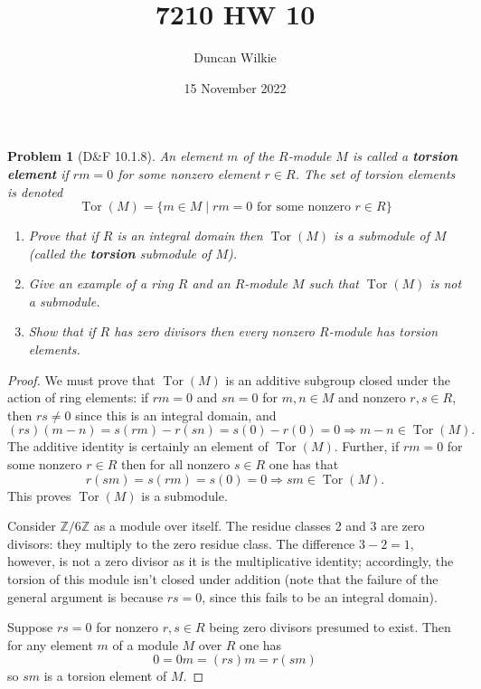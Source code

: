 \documentclass{article}
\title{7210 HW 10}
\author{Duncan Wilkie}
\date{15 November 2022}
\newtheorem{plm}{Problem}
\DeclareMathOperator{\Tor}{Tor}
\begin{document}
\maketitle

\begin{plm}[D\&F 10.1.8]
  An element $m$ of the $R$-module $M$ is called a \textbf{torsion element} if $rm = 0$ for some nonzero element $r \in R$.
  The set of torsion elements is denoted
  \[
    \Tor(M) = \{m \in M \mid rm = 0 \text{ for some nonzero } r \in R\}
  \]
  \begin{enumerate}
  \item Prove that if $R$ is an integral domain then $\Tor(M)$ is a submodule of $M$ (called the \textbf{torsion} submodule of $M$).
  \item Give an example of a ring $R$ and an $R$-module $M$ such that $\Tor(M)$ is not a submodule.
  \item Show that if $R$ has zero divisors then every nonzero $R$-module has torsion elements.
  \end{enumerate}
\end{plm}

\begin{proof}
  We must prove that $\Tor(M)$ is an additive subgroup closed under the action of ring elements: if $rm = 0$ and $sn = 0$ for $m, n \in M$
  and nonzero $r, s \in R$, then $rs \neq 0$ since this is an integral domain, and
  \[
    (rs)(m - n) = s(rm) - r(sn) = s(0) - r(0) = 0 \Rightarrow m - n \in \Tor(M).
  \]
  The additive identity is certainly an element of $\Tor(M)$.
  Further, if $rm = 0$ for some nonzero $r \in R$ then for all nonzero $s \in R$ one has that
  \[
    r(sm) = s(rm) = s(0) = 0 \Rightarrow sm \in \Tor(M).
  \]
  This proves $\Tor(M)$ is a submodule.

  Consider $\mathbb{Z} / 6\mathbb{Z}$ as a module over itself.
  The residue classes 2 and 3 are zero divisors: they multiply to the zero residue class.
  The difference $3 - 2 = 1$, however, is not a zero divisor as it is the multiplicative identity; accordingly,
  the torsion of this module isn't closed under addition (note that the failure of the general argument is because $rs = 0$,
  since this fails to be an integral domain).

  Suppose $rs = 0$ for nonzero $r, s \in R$ being zero divisors presumed to exist.
  Then for any element $m$ of a module $M$ over $R$ one has
  \[
    0 = 0m = (rs)m = r(sm)
  \]
  so $sm$ is a torsion element of $M$.
\end{proof}
\end{document}
